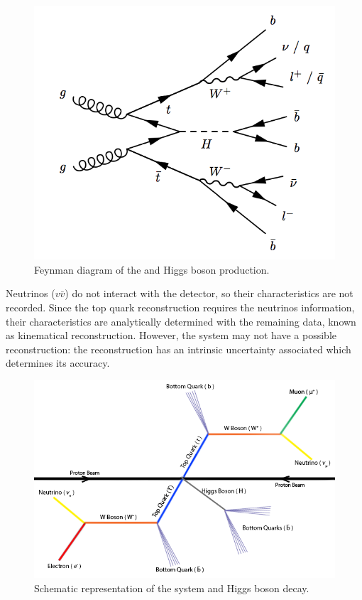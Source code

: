 \begin{figure}[!htp]
	\begin{center}
		\includegraphics[scale=0.3]{imgs/ttH_feynman.png}
		\caption{Feynman diagram of the \ttbar and Higgs boson production.}
		\label{fig:ttH}
	\end{center}
\end{figure}

Neutrinos ($v\bar{v}$) do not interact with the detector, so their characteristics are not recorded. Since the top quark reconstruction requires the neutrinos information, their characteristics are analytically determined with the remaining data, known as kinematical reconstruction. However, the \ttbar system may not have a possible reconstruction: the reconstruction has an intrinsic uncertainty associated which determines its accuracy.

\begin{figure}[!htp]
	\begin{center}
		\includegraphics[scale=0.45]{imgs/ttbar_higgs.png}
		\caption{Schematic representation of the \ttbar system and Higgs boson decay.}
		\label{fig:ttbar}
	\end{center}
\end{figure}

